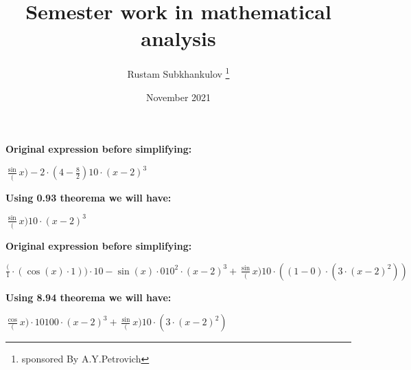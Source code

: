 \documentclass[a4paper, 12pt] {article}
\title{Semester work in mathematical analysis}
\author{Rustam Subkhankulov \thanks{sponsored By A.Y.Petrovich}}
\date{November 2021}
\begin{document}
 
\maketitle
\newpage



 \textbf{Original expression before simplifying:}

\begin{math}
 \frac \sin(x)-2 \cdot (4- \frac 82)10 \cdot (x-2)^3
\end{math}




 \textbf{Using 0.93 theorema we will have:}

\begin{math}
 \frac \sin(x)10 \cdot (x-2)^3
\end{math}




 \textbf{Original expression before simplifying:}

\begin{math}
 \frac (1 \cdot (\cos(x) \cdot 1)) \cdot 10-\sin(x) \cdot 010^2 \cdot (x-2)^3+ \frac \sin(x)10 \cdot ((1-0) \cdot (3 \cdot (x-2)^2))
\end{math}




 \textbf{Using 8.94 theorema we will have:}

\begin{math}
 \frac \cos(x) \cdot 10100 \cdot (x-2)^3+ \frac \sin(x)10 \cdot (3 \cdot (x-2)^2)
\end{math}
\end{document}
